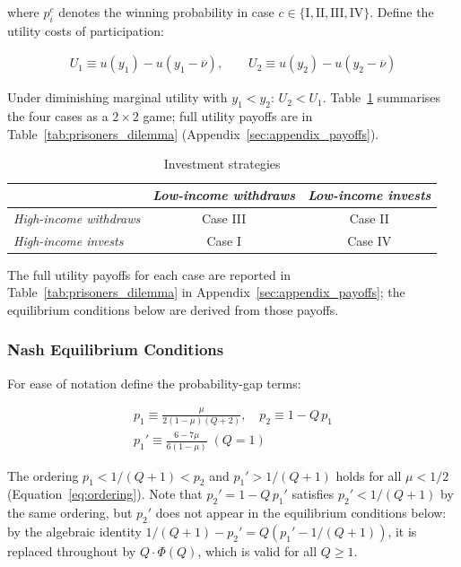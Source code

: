 \documentclass[
    oneside,
    fontsize=10pt,leqno]{article}
\begin{document}
where $p_{i}^{c}$ denotes the winning probability in case $c\in\{\mathrm{I,II,III,IV}\}$.
Define the utility costs of participation:

\begin{align*}
U_{1}\equiv u(y_{1})-u(y_{1}-\overline{\nu}),\qquad U_{2}\equiv u(y_{2})-u(y_{2}-\overline{\nu})
\end{align*}

Under diminishing marginal utility with $y_{1}<y_{2}$: $U_{2}<U_{1}$.
Table~\ref{tab:prisoners_dilemma_cases} summarises the four cases
as a $2\times2$ game; full utility payoffs are in
Table~\ref{tab:prisoners_dilemma} (Appendix~\ref{sec:appendix_payoffs}).

\begin{table}[H]
\centering
\caption{\label{tab:prisoners_dilemma_cases}Investment strategies}
\smallskip
\begin{tabular}{lcc}
\toprule
 & \textit{Low-income withdraws} & \textit{Low-income invests}\\
\midrule
\textit{High-income withdraws} & Case III & Case II\\
\textit{High-income invests}   & Case I   & Case IV\\
\bottomrule
\end{tabular}
\end{table}


The full utility payoffs for each case are reported in
Table~\ref{tab:prisoners_dilemma} in Appendix~\ref{sec:appendix_payoffs};
the equilibrium conditions below are derived from those payoffs.

\subsubsection{Nash Equilibrium Conditions}

For ease of notation define the probability-gap terms:

\begin{gather}
p_{1}\equiv\frac{\mu}{2(1-\mu)(Q+2)},\quad p_{2}\equiv1-Q\,p_{1}\nonumber\\
p_{1}'\equiv\frac{6-7\mu}{6(1-\mu)}\;(Q=1)\label{eq:probabilities}
\end{gather}

The ordering $p_{1}<1/(Q+1)<p_{2}$ and $p_{1}'>1/(Q+1)$
holds for all $\mu<1/2$ (Equation~\ref{eq:ordering}). Note that
$p_{2}'=1-Q\,p_{1}'$ satisfies $p_{2}'<1/(Q+1)$ by the same
ordering, but $p_{2}'$ does not appear in the equilibrium conditions
below: by the algebraic identity $1/(Q+1)-p_{2}'=Q(p_{1}'-1/(Q+1))$,
it is replaced throughout by $Q\cdot\Phi(Q)$, which is valid for all
$Q\geq1$.
\end{document}

